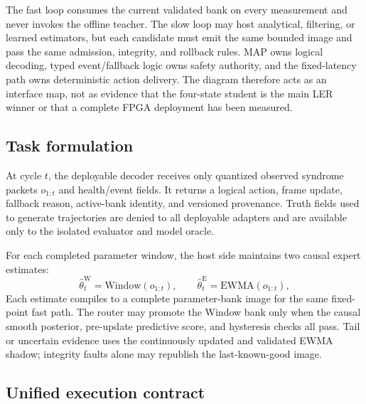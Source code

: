 \documentclass[11pt]{article}
\begin{document}
The fast loop consumes the current validated bank on every measurement and
never invokes the offline teacher.  The slow loop may host analytical,
filtering, or learned estimators, but each candidate must emit the same bounded
image and pass the same admission, integrity, and rollback rules.  MAP owns
logical decoding, typed event/fallback logic owns safety authority, and the
fixed-latency path owns deterministic action delivery.  The diagram therefore
acts as an interface map, not as evidence that the four-state student is the
main LER winner or that a complete FPGA deployment has been measured.

\subsection{Task formulation}

At cycle $t$, the deployable decoder receives only quantized observed syndrome
packets $o_{1:t}$ and health/event fields.  It returns a logical action, frame
update, fallback reason, active-bank identity, and versioned provenance.  Truth
fields used to generate trajectories are denied to all deployable adapters and
are available only to the isolated evaluator and model oracle.

For each completed parameter window, the host side maintains two causal expert
estimates:
\begin{equation}
  \widehat\theta_t^{\mathrm W}=\mathrm{Window}(o_{1:t}),
  \qquad
  \widehat\theta_t^{\mathrm E}=\mathrm{EWMA}(o_{1:t}),
\end{equation}
Each estimate compiles to a complete parameter-bank image for the same
fixed-point fast path.  The router may promote the Window bank only when the
causal smooth posterior, pre-update predictive score, and hysteresis checks all
pass.  Tail or uncertain evidence uses the continuously updated and validated
EWMA shadow; integrity faults alone may republish the last-known-good image.

\subsection{Unified execution contract}
\end{document}
